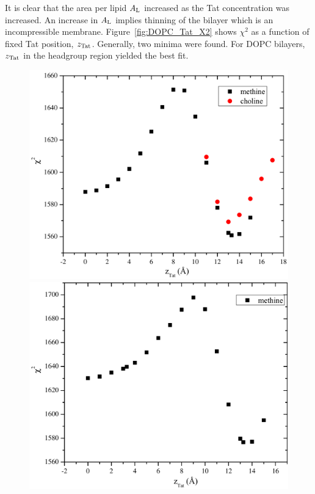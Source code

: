 It is clear that the area per lipid $A_\textrm{L}$ increased as the Tat concentration was
increased. An increase in $A_\textrm{L}$ implies thinning of the bilayer which is an 
incompressible membrane.
Figure~\ref{fig:DOPC_Tat_X2} shows $\chi^2$ as a function of fixed Tat position, 
$z_\textrm{Tat}$. Generally, two minima were found. For DOPC bilayers, $z_\textrm{Tat}$ in the 
headgroup region yielded the best fit.
\begin{figure}[htbp]
  \centering
  \includegraphics[scale=0.3]{figures/Tat/SDP_Results/X2/DOPC_Tat_62to1_3p0_X2} 
  \includegraphics[scale=0.3]{figures/Tat/SDP_Results/X2/DOPC_Tat_28to1_3p0_X2} 

\end{figure}
